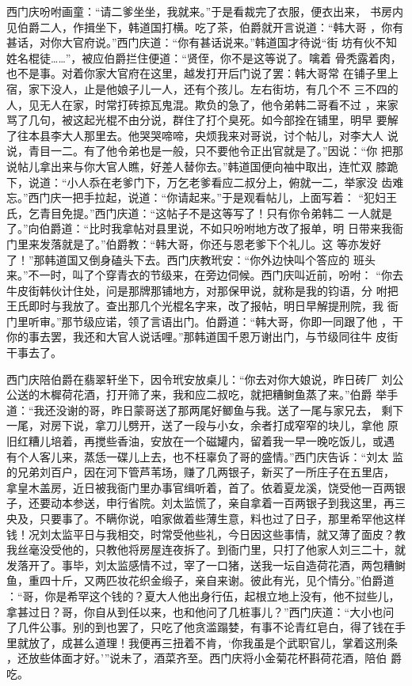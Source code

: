西门庆吩咐画童：“请二爹坐坐，我就来。”于是看裁完了衣服，便衣出来，
书房内见伯爵二人，作揖坐下，韩道国打横。吃了茶，伯爵就开言说道：“韩大哥
，你有甚话，对你大官府说。”西门庆道：“你有甚话说来。”韩道国才待说“街
坊有伙不知姓名棍徒……”，被应伯爵拦住便道：“贤侄，你不是这等说了。噙着
骨秃露着肉，也不是事。对着你家大官府在这里，越发打开后门说了罢：韩大哥常
在铺子里上宿，家下没人，止是他娘子儿一人，还有个孩儿。左右街坊，有几个不
三不四的人，见无人在家，时常打砖掠瓦鬼混。欺负的急了，他令弟韩二哥看不过
，来家骂了几句，被这起光棍不由分说，群住了打个臭死。如今部拴在铺里，明早
要解了往本县李大人那里去。他哭哭啼啼，央烦我来对哥说，讨个帖儿，对李大人
说说，青目一二。有了他令弟也是一般，只不要他令正出官就是了。”因说：“你
把那说帖儿拿出来与你大官人瞧，好差人替你去。”韩道国便向袖中取出，连忙双
膝跪下，说道：“小人忝在老爹门下，万乞老爹看应二叔分上，俯就一二，举家没
齿难忘。”西门庆一把手拉起，说道：“你请起来。”于是观看帖儿，上面写着：
“犯妇王氏，乞青目免提。”西门庆道：“这帖子不是这等写了！只有你令弟韩二
一人就是了。”向伯爵道：“比时我拿帖对县里说，不如只吩咐地方改了报单，明
日带来我衙门里来发落就是了。”伯爵教：“韩大哥，你还与恩老爹下个礼儿。这
等亦发好了！”那韩道国又倒身磕头下去。西门庆教玳安：“你外边快叫个答应的
班头来。”不一时，叫了个穿青衣的节级来，在旁边伺候。西门庆叫近前，吩咐：
“你去牛皮街韩伙计住处，问是那牌那铺地方，对那保甲说，就称是我的钧语，分
咐把王氏即时与我放了。查出那几个光棍名字来，改了报帖，明日早解提刑院，我
衙门里听审。”那节级应诺，领了言语出门。伯爵道：“韩大哥，你即一同跟了他
，干你的事去罢，我还和大官人说话哩。”那韩道国千恩万谢出门，与节级同往牛
皮街干事去了。

西门庆陪伯爵在翡翠轩坐下，因令玳安放桌儿：“你去对你大娘说，昨日砖厂
刘公公送的木樨荷花酒，打开筛了来，我和应二叔吃，就把糟鲥鱼蒸了来。”伯爵
举手道：“我还没谢的哥，昨日蒙哥送了那两尾好鲫鱼与我。送了一尾与家兄去，
剩下一尾，对房下说，拿刀儿劈开，送了一段与小女，余者打成窄窄的块儿，拿他
原旧红糟儿培着，再搅些香油，安放在一个磁罐内，留着我一早一晚吃饭儿，或遇
有个人客儿来，蒸恁一碟儿上去，也不枉辜负了哥的盛情。”西门庆告诉：“刘太
监的兄弟刘百户，因在河下管芦苇场，赚了几两银子，新买了一所庄子在五里店，
拿皇木盖房，近日被我衙门里办事官缉听着，首了。依着夏龙溪，饶受他一百两银
子，还要动本参送，申行省院。刘太监慌了，亲自拿着一百两银子到我这里，再三
央及，只要事了。不瞒你说，咱家做着些薄生意，料也过了日子，那里希罕他这样
钱！况刘太监平日与我相交，时常受他些礼，今日因这些事情，就又薄了面皮？教
我丝毫没受他的，只教他将房屋连夜拆了。到衙门里，只打了他家人刘三二十，就
发落开了。事毕，刘太监感情不过，宰了一口猪，送我一坛自造荷花酒，两包糟鲥
鱼，重四十斤，又两匹妆花织金缎子，亲自来谢。彼此有光，见个情分。”伯爵道
：“哥，你是希罕这个钱的？夏大人他出身行伍，起根立地上没有，他不挝些儿，
拿甚过日？哥，你自从到任以来，也和他问了几桩事儿？”西门庆道：“大小也问
了几件公事。别的到也罢了，只吃了他贪滥蹋婪，有事不论青红皂白，得了钱在手
里就放了，成甚么道理！我便再三扭着不肯，‘你我虽是个武职官儿，掌着这刑条
，还放些体面才好。’”说未了，酒菜齐至。西门庆将小金菊花杯斟荷花酒，陪伯
爵吃。

